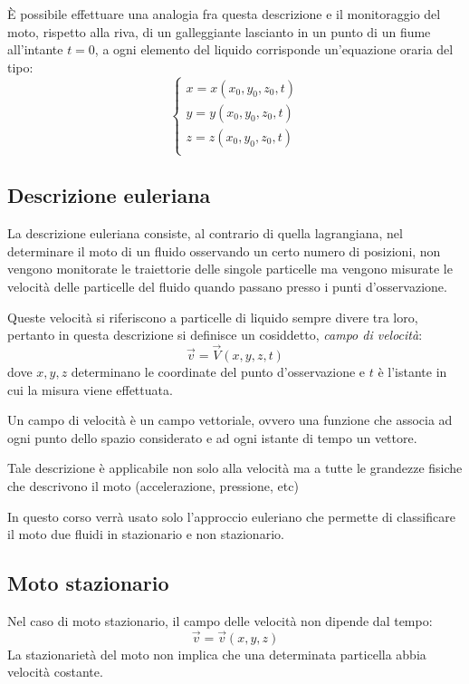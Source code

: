 \documentclass[11pt, a4paper, openright]{book}
\theoremstyle{plain}
\theoremstyle{definition}
\begin{document}
È possibile effettuare una analogia fra questa descrizione e il monitoraggio del moto, rispetto alla riva, di un galleggiante lascianto in un punto di un fiume all'intante $t = 0$, a ogni elemento del liquido corrisponde un'equazione oraria del tipo:
\begin{equation}
    \begin{cases}
        x = x(x_0, y_0, z_0, t) \\
        y = y(x_0, y_0, z_0, t) \\
        z = z(x_0, y_0, z_0, t) \\
    \end{cases}
\end{equation}

\subsection{Descrizione euleriana}
La descrizione euleriana consiste, al contrario di quella lagrangiana, nel determinare il moto di un fluido osservando un certo numero di posizioni, non vengono monitorate le traiettorie delle singole particelle ma vengono misurate le velocità delle particelle del fluido quando passano presso i punti d'osservazione.

Queste velocità si riferiscono a particelle di liquido sempre divere tra loro, pertanto in questa descrizione si definisce un cosiddetto, \textit{campo di velocità}:
\begin{equation}
    \vec{v} = \vec{V}(x, y, z, t)
\end{equation}  
dove $x, y, z$ determinano le coordinate del punto d'osservazione e $t$ è l'istante in cui la misura viene effettuata.

Un campo di velocità è un campo vettoriale, ovvero una funzione che associa ad ogni punto dello spazio considerato e ad ogni istante di tempo un vettore.

Tale descrizione è applicabile non solo alla velocità ma a tutte le grandezze fisiche che descrivono il moto (accelerazione, pressione, etc)

In questo corso verrà usato solo l'approccio euleriano che permette di classificare il moto due fluidi in stazionario e non stazionario.

\subsection{Moto stazionario}
Nel caso di moto stazionario, il campo delle velocità non dipende dal tempo:
\begin{equation}
    \vec{v} = \vec{v}(x, y, z)
\end{equation}
La stazionarietà del moto non implica che una determinata particella abbia velocità costante.
\end{document}
